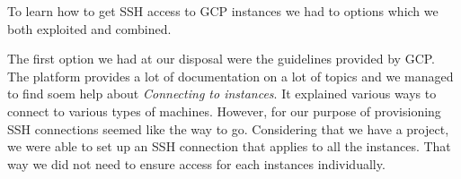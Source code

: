 To learn how to get SSH access to GCP instances we had to options
which we both exploited and combined.

The first option we had at our disposal were the guidelines provided
by GCP. The platform provides a lot of documentation on a lot of
topics and we managed to find soem help about \textit{Connecting to
instances}. It explained various ways to connect to various types of
machines. However, for our purpose of provisioning SSH connections
seemed like the way to go. Considering that we have a project, we were
able to set up an SSH connection that applies to all the instances.
That way we did not need to ensure access for each instances
individually.
